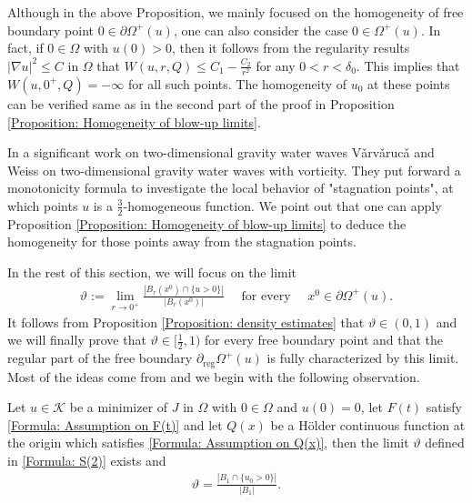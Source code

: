 \documentclass[11pt,reqno]{amsart}
\begin{document}
\begin{remark}
	Although in the above Proposition, we mainly focused on the homogeneity of free boundary point $0\in\partial\varOmega^{+}(u)$, one can also consider the case  $0\in\varOmega^{+}(u)$. In fact, if $0\in\Omega$ with $u(0)>0$, then it follows from the regularity results $|\nabla u|^{2}\leqslant C$ in $\Omega$ that $W(u,r,Q)\leqslant C_{1}-\tfrac{C_{2}}{r^{2}}$ for any $0<r<\delta_{0}$. This implies that $W(u,0^{+},Q)=-\infty$ for all such points. The homogeneity of $u_{0}$ at these points can be verified same as in the second part of the proof in Proposition \ref{Proposition: Homogeneity of blow-up limits}.
\end{remark}
\begin{remark}
	In a significant work \cite{VW2012} on two-dimensional gravity water waves V\v{a}rv\v{a}ruc\v{a} and Weiss on two-dimensional gravity water waves with vorticity. They put forward a monotonicity formula to investigate the local behavior of "stagnation points", at which points $u$ is a  $\tfrac{3}{2}$-homogeneous function. We point out that one can apply Proposition \ref{Proposition: Homogeneity of blow-up limits} to deduce the homogeneity for those points away from the stagnation points.
\end{remark}
In the rest of this section, we will focus on the limit
\begin{align}\label{Formula: S(2)}
	\vartheta:=\lim_{r\to0^{+}}\frac{|B_{r}(x^{0})\cap\{u>0\}|}{|B_{r}(x^{0})|}\quad\text{ for every }\quad x^{0}\in\partial\varOmega^{+}(u).
\end{align}
It follows from Proposition \ref{Proposition: density estimates} that $\vartheta\in(0,1)$ and we will finally prove that $\vartheta\in[\tfrac{1}{2},1)$ for every free boundary point and that the regular part of the free boundary $\partial_{\mathrm{reg}}\varOmega^{+}(u)$ is fully characterized by this limit. Most of the ideas come from \cite{MTV2017} and we begin with the following observation.
\begin{proposition}
	Let $u\in\mathcal{K}$ be a minimizer of $J$ in $\Omega$ with $0\in\Omega$ and $u(0)=0$, let $F(t)$ satisfy \eqref{Formula: Assumption on F(t)} and let $Q(x)$ be a H\"{o}lder continuous function at the origin which satisfies \eqref{Formula: Assumption on Q(x)}, then the limit $\vartheta$ defined in \eqref{Formula: S(2)} exists and
	\begin{align}\label{Formula: S(3)}
		\vartheta=\frac{|B_{1}\cap\{u_{0}>0\}|}{|B_{1}|}.
	\end{align}
\end{proposition}
\end{document}
